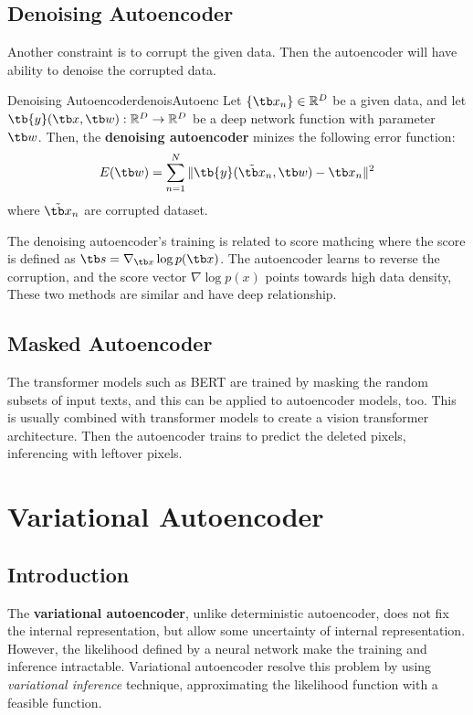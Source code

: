 \documentclass{article}
\begin{document}
    \subsection{Denoising Autoencoder}
        Another constraint is to corrupt the given data. Then the autoencoder will have ability to denoise the corrupted data.
        \begin{defn}{Denoising Autoencoder}{denoisAutoenc}
            Let $\{\tb x_n\} \in \mathbb{R}^D$ be a given data, and let $\tb{y}(\tb x, \tb w) : \mathbb{R}^D \to \mathbb{R}^D$
            be a deep network function with parameter $\tb w$.
            Then, the \textbf{denoising autoencoder} minizes the following error function:
            \[
            E(\tb w)=\sum_{n=1}^{N}\|\tb{y}(\tilde{\tb x}_n, \tb w) - \tb x_n\|^2
            \]
            where $\tilde{\tb x}_n$ are corrupted dataset. 
        \end{defn}
        The denoising autoencoder's training is related to score mathcing where the score is defined as $\tb s = \nabla_{\tb x}\log{p(\tb x)}$.
        The autoencoder learns to reverse the corruption, and the score vector $\nabla\log{p(x)}$ points towards high data density,
        These two methods are similar and have deep relationship.
    \subsection{Masked Autoencoder}
        The transformer models such as BERT are trained by masking the random subsets of input texts, and this can be applied to autoencoder models, too.
        This is usually combined with transformer models to create a vision transformer architecture.
        Then the autoencoder trains to predict the deleted pixels, inferencing with leftover pixels.

\section{Variational Autoencoder}
    \subsection{Introduction}
        The \textbf{variational autoencoder}, unlike deterministic autoencoder, does not fix the internal representation, but allow some uncertainty
        of internal representation. However, the likelihood defined by a neural network make the training and inference intractable.
        Variational autoencoder resolve this problem by using \emph{variational inference} technique, approximating the likelihood function with a
        feasible function.
\end{document}
